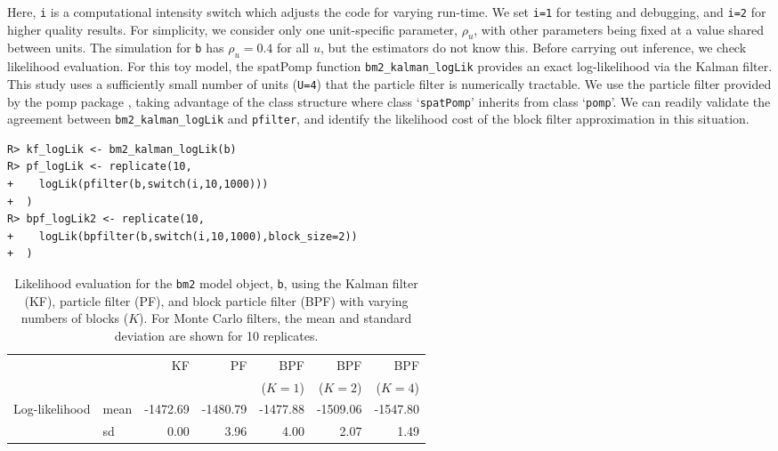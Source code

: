 \documentclass[12pt]{article}\usepackage[]{graphicx}\usepackage[]{xcolor}
\makeatletter
\newenvironment{kframe}{%
 \def\at@end@of@kframe{}%
 \ifinner\ifhmode%
  \def\at@end@of@kframe{\end{minipage}}%
  \begin{minipage}{\columnwidth}%
 \fi\fi%
 \def\FrameCommand##1{\hskip\@totalleftmargin \hskip-\fboxsep
 \colorbox{shadecolor}{##1}\hskip-\fboxsep
     \hskip-\linewidth \hskip-\@totalleftmargin \hskip\columnwidth}%
 \MakeFramed {\advance\hsize-\width
   \@totalleftmargin\z@ \linewidth\hsize
   \@setminipage}}%
 {\par\unskip\endMakeFramed%
 \at@end@of@kframe}
\newenvironment{knitrout}{}{} %
\newcommand\code[1]{\texttt{#1}}
\newcommand{\pkg}[1]{{\fontseries{b}\selectfont #1}}
\newcommand\class[1]{class `\code{#1}'}
\newcommand\unit{u}
\makeatother
\begin{document}
Here, \code{i} is a computational intensity switch which adjusts the code for varying run-time.
We set \code{i=1} for testing and debugging, and \code{i=2} for higher quality results.
For simplicity, we consider only one unit-specific parameter, $\rho_{\unit}$, with other parameters being fixed at a value shared between units.
The simulation for \code{b} has $\rho_u=0.4$ for all $\unit$, but the estimators do not know this.
Before carrying out inference, we check likelihood evaluation.
For this toy model, the \pkg{spatPomp} function \code{bm2\_kalman\_logLik} provides an exact log-likelihood via the Kalman filter.
This study uses a sufficiently small number of units (\code{U=4}) that the particle filter is numerically tractable.
We use the particle filter provided by the \pkg{pomp} package \citep{king16}, taking advantage of the class structure where \class{spatPomp} inherits from \class{pomp}.
We can readily validate the agreement between \code{bm2\_kalman\_logLik} and \code{pfilter}, and identify the likelihood cost of the block filter approximation in this situation.

\begin{knitrout}
\color{fgcolor}\begin{kframe}
\begin{verbatim}
R> kf_logLik <- bm2_kalman_logLik(b)
R> pf_logLik <- replicate(10,
+    logLik(pfilter(b,switch(i,10,1000)))
+  )
R> bpf_logLik2 <- replicate(10,
+    logLik(bpfilter(b,switch(i,10,1000),block_size=2))
+  )
\end{verbatim}
\end{kframe}
\end{knitrout}



\begin{table}
\begin{tabular}{llrrrrr}
               & & KF & PF & BPF & BPF & BPF
	       \\
               & &  &  & ($K=1$) & ($K=2$) & ($K=4$)
	       
\\
\hline
Log-likelihood & mean &
  -1472.69 &
  -1480.79 &
  -1477.88 &
  -1509.06 &
  -1547.80 
\\  
               & sd &
  0.00 &
  3.96 &
  4.00 &
  2.07 &
  1.49 
\end{tabular}
\caption{Likelihood evaluation for the \code{bm2} model object, \code{b}, using the Kalman filter (KF), particle filter (PF), and block particle filter (BPF) with varying numbers of blocks ($K$).
For Monte Carlo filters, the mean and standard deviation are shown for 10 replicates.
}\label{tab:lik-eval}
\end{table}
\end{document}
